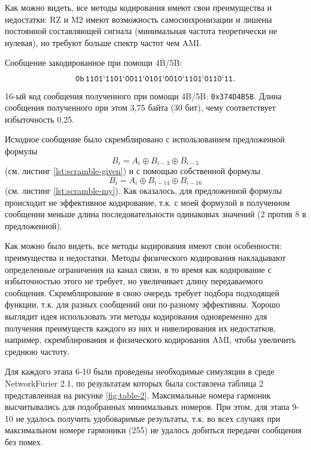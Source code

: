 Как можно видеть, все методы кодирования имеют свои преимущества и недостатки:  RZ и M2 имеют возможность самосинхронизации и лишены постоянной составляющей сигнала (минимальная частота теоретически не нулевая), но требуют больше спектр частот чем AMI.


Сообщение закодированное при помощи 4B/5B: 
$$
\mathtt{0b\,1101`1101`0011`0101`0010`1101`0110`11}.
$$ 
16-ый код сообщения полученного при помощи 4B/5B: \verb|0x374D4B5B|.
Длина сообщения полученного при этом 3,75 байта (30 бит),
чему соответствует избыточность 0,25.


Исходное сообщение было скремблировано с использованием предложенной формулы
$$
    B_i = A_i\oplus B_{i-3}\oplus B_{i-5}
$$ 
(см. листинг \ref{lst:scramble-given}) и с помощью собственной формулы
$$
    B_i = A_i\oplus B_{i-14}\oplus B_{i-16}
$$ 
(см. листинг \ref{lst:scramble-my}). Как оказалось, для предложенной формулы происходит не эффективное кодирование, т.к. с моей формулой в полученном сообщении меньше длина последовательности одинаковых значений (2 против 8 в предложенной). 






Как можно было видеть, все методы кодирования имеют свои особенности: преимущества и недостатки. Методы физического кодирования накладывают определенные ограничения на канал связи, в то время как кодирование с избыточностью этого не требует, но увеличивает длину передаваемого сообщения. Скремблирование в свою очередь требует подбора подходящей функции, т.к. для разных сообщений они по-разному эффективны.
Хорошо выглядит идея использовать эти методы кодирования одновременно для получения преимуществ каждого из них и нивелирования их недостатков, например, скремблирования и физического кодирования AMI, чтобы увеличить среднюю частоту.


Для каждого этапа 6-10 были проведены необходимые симуляции в среде NetworkFurier 2.1, по результатам которых была составлена таблица 2 представленная на рисунке \ref{fig:table-2}. Максимальные номера гармоник высчитывались для подобранных минимальных номеров. При этом, для этапа 9-10 не удалось получить удобоваримые результаты, т.к. во всех случаях при максимальном номере гармоники (255) не удалось добиться передачи сообщения без помех.

